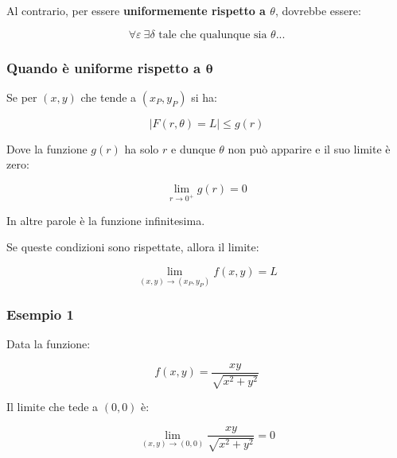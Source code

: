 \documentclass[a4paper]{article}
\begin{document}
	\noindent
	Al contrario, per essere \textbf{uniformemente rispetto a $\theta$}, dovrebbe essere:
	
	\begin{equation*}
		\forall\varepsilon \: \exists\delta \text{ tale che qualunque sia } \theta ...
	\end{equation*}

	\subsubsection[Quando è uniforme rispetto a $\boldsymbol{\theta}$]{\textcolor{Red3}{Quando è uniforme rispetto a $\boldsymbol{\theta}$}}
	
	Se per $\left(x,y\right)$ che tende a $\left(x_{P},y_{P}\right)$ si ha:
	
	\begin{equation*}
		\left|F\left(r,\theta\right) = L\right| \le g\left(r\right)
	\end{equation*}

	\noindent
	Dove la funzione $g\left(r\right)$ ha solo $r$ e dunque $\theta$ non può apparire e il suo limite è zero:
	
	\begin{equation*}
		\lim_{r \rightarrow 0^{+}} g\left(r\right) = 0
	\end{equation*}

	\noindent
	In altre parole è la funzione infinitesima.\newline
	
	\noindent
	Se queste condizioni sono rispettate, allora il limite:
	
	\begin{equation*}
		\lim_{\left(x,y\right) \rightarrow \left(x_{P},y_{P}\right)} f\left(x,y\right) = L
	\end{equation*}

	\newpage
	
	\subsubsection[Esempio 1]{\textcolor{Green4}{Esempio 1}}
	
	Data la funzione:
	
	\begin{equation*}
		f\left(x,y\right) = \dfrac{xy}{\sqrt{x^{2} + y^{2}}}
	\end{equation*}

	\noindent
	Il limite che tede a $\left(0,0\right)$ è:
	
	\begin{equation*}
		\lim_{\left(x,y\right) \rightarrow \left(0,0\right)} \dfrac{xy}{\sqrt{x^{2} + y^{2}}} = 0
	\end{equation*}
\end{document}
